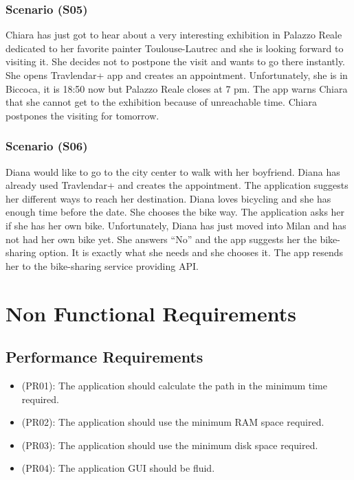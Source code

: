 \documentclass[a4paper,leqno]{book}
\begin{document}
\subsection{Scenario (S05)}
Chiara has just got to hear about a very interesting exhibition in Palazzo Reale dedicated to her favorite painter Toulouse-Lautrec and she is looking forward to visiting it. She decides not to postpone the visit and wants to go there instantly. She opens Travlendar+ app and creates an appointment. Unfortunately, she is in Biccoca, it is 18:50 now but Palazzo Reale closes at 7 pm.   The app warns Chiara that she cannot get to the exhibition because of unreachable time. Chiara postpones the visiting for tomorrow.

\subsection{Scenario (S06)}
Diana would like to go to the city center to walk with her boyfriend. Diana has already used Travlendar+ and creates the appointment. The application suggests her different ways to reach her destination. Diana loves bicycling and she has enough time before the date. She chooses the bike way. The application asks her if she has her own bike. Unfortunately, Diana has just moved into Milan and has not had her own bike yet. She answers “No” and the app suggests her the bike-sharing option. It is exactly what she needs and she chooses it. The app resends her to the bike-sharing service providing API. 


\chapter{Non Functional Requirements}

\section{Performance Requirements}
\begin{itemize}
\item (PR01): The application should calculate the path in the minimum time required.
\item (PR02): The application should use the minimum RAM space required.
\item (PR03): The application should use the minimum disk space required.
\item (PR04): The application GUI should be fluid.
\end{itemize}
\end{document}
